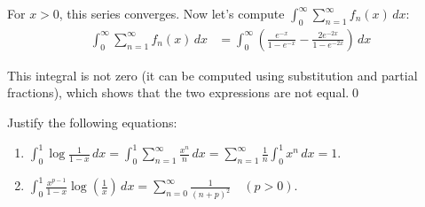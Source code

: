 For $x > 0$, this series converges. Now let's compute $\int_{0}^{\infty} \sum_{n=1}^{\infty} f_n(x) \, dx$:
\begin{align*}
\int_{0}^{\infty} \sum_{n=1}^{\infty} f_n(x) \, dx &= \int_{0}^{\infty} \left(\frac{e^{-x}}{1 - e^{-x}} - \frac{2e^{-2x}}{1 - e^{-2x}}\right) \, dx
\end{align*}

This integral is not zero (it can be computed using substitution and partial fractions), which shows that the two expressions are not equal.\qed


\begin{problembox}
Justify the following equations:
\begin{enumerate}[label=(\alph*)]
    \item $\int_{0}^{1} \log \frac{1}{1-x} \, dx = \int_{0}^{1} \sum_{n=1}^{\infty} \frac{x^n}{n} \, dx = \sum_{n=1}^{\infty} \frac{1}{n} \int_{0}^{1} x^n \, dx = 1.$
    \item $\int_{0}^{1} \frac{x^{p-1}}{1-x} \log \left( \frac{1}{x} \right) \, dx = \sum_{n=0}^{\infty} \frac{1}{(n+p)^2} \quad (p > 0).$
\end{enumerate}
\end{problembox}

